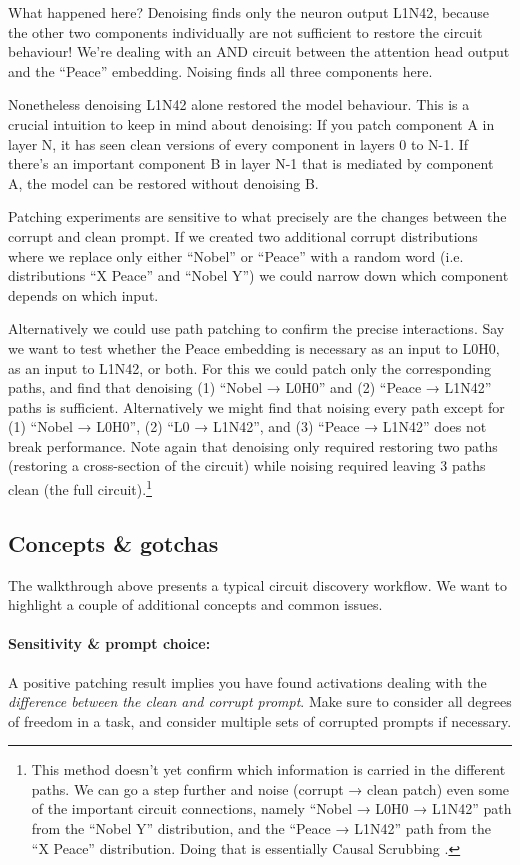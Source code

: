 \documentclass[nonatbib]{article}
\begin{document}
What happened here? Denoising finds only the neuron output  L1N42, because the other two components individually are not sufficient to restore the circuit behaviour! We’re dealing with an AND circuit between the attention head output and the “Peace” embedding. Noising finds all three components here.

Nonetheless denoising L1N42 alone restored the model behaviour. This is a crucial intuition to keep in mind about denoising: If you patch component A in layer N, it has seen clean versions of every component in layers 0 to N-1. If there’s an important component B in layer N-1 that is mediated by component A, the model can be restored without denoising B.

Patching experiments are sensitive to what precisely are the changes between the corrupt and clean prompt. If we created two additional corrupt distributions where we replace only either “Nobel” or “Peace” with a random word (i.e. distributions “X Peace” and “Nobel Y”) we could narrow down which component depends on which input.

Alternatively we could use path patching to confirm the precise interactions. Say we want to test whether the Peace embedding is necessary as an input to L0H0, as an input to L1N42, or both. For this we could patch only the corresponding paths, and find that denoising (1) “Nobel → L0H0” and (2) “Peace → L1N42” paths is sufficient. Alternatively we might find that noising every path except for (1) “Nobel → L0H0”, (2) “L0 → L1N42”, and (3) “Peace → L1N42” does not break performance. Note again that denoising only required restoring two paths (restoring a cross-section of the circuit) while noising required leaving 3 paths clean (the full circuit).\footnote{This method doesn’t yet confirm which information is carried in the different paths. We can go a step further and noise (corrupt → clean patch) even some of the important circuit connections, namely “Nobel → L0H0 → L1N42” path from the “Nobel Y” distribution, and the “Peace → L1N42” path from the “X Peace” distribution. Doing that is essentially Causal Scrubbing \citep{causal_scrubbing}.}

\subsection{Concepts \& gotchas}
The walkthrough above presents a typical circuit discovery workflow. We want to highlight a couple of additional concepts and common issues.

\paragraph{Sensitivity \& prompt choice:} A positive patching result implies you have found activations dealing with the \textit{difference between the clean and corrupt prompt}. Make sure to consider all degrees of freedom in a task, and consider multiple sets of corrupted prompts if necessary.
\end{document}
